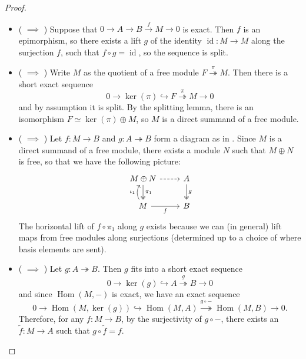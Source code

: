 \documentclass[11pt]{article}
\newcommand{\Hom}{\operatorname{Hom}}
\renewcommand{\ker}{\operatorname{ker}}
\theoremstyle{plain}
\theoremstyle{definition}
\begin{document}
\begin{proof}
\begin{itemize}
    \item ( \(\implies\) ) Suppose that \(0 \to A \to B \overset{f}{\to} M \to 0\) is exact. Then \(f\) is an epimorphism, so there exists a lift \(g\) of the identity \(\operatorname{id} : M \to M\) along the surjection \(f\), such that \(f \circ g = \operatorname{id}\), so the sequence is split.
    \item ( \(\implies\) ) Write \(M\) as the quotient of a free module \(F \overset{\pi}{\twoheadrightarrow} M\). Then there is a short exact sequence
      \[ 0 \to \ker(\pi) \hookrightarrow F \overset{\pi}{\twoheadrightarrow} M \to 0 \]
      and by assumption it is split. By the splitting lemma, there is an isomorphism \(F \simeq \ker(\pi) \oplus M\), so \(M\) is a direct summand of a free module.
    \item ( \(\implies\) ) Let \(f : M \to B\) and \(g : A \twoheadrightarrow B\) form a diagram as in . Since \(M\) is a direct summand of a free module, there exists a module \(N\) such that \(M \oplus N\) is free, so that we have the following picture:
      \[
        \begin{tikzcd}
         M \oplus N \arrow[two heads]{d}{\pi_1} \arrow[dashed]{r} & A \arrow[two heads]{d}{g} \\
         M \arrow[bend left]{u}{\iota_1} \arrow[swap]{r}{f} & B  
        \end{tikzcd}
      \]
      The horizontal lift of \(f \circ \pi_1\) along \(g\) exists because we can (in general) lift maps from free modules along surjections (determined up to a choice of where basis elements are sent).
    \item ( \(\implies\) ) Let \(g : A \twoheadrightarrow B\). Then \(g\) fits into a short exact sequence
      \[
        0 \to \ker(g) \hookrightarrow A \overset{g}{\twoheadrightarrow} B \to 0
      \]
      and since \(\Hom(M,-)\) is exact, we have an exact sequence
      \[
        0 \to \Hom(M,\ker(g)) \hookrightarrow \Hom(M, A) \overset{g \circ -}{\twoheadrightarrow} \Hom(M, B) \to 0.
      \]
      Therefore, for any \(f : M \to B\), by the surjectivity of \(g \circ -\), there exists an \(\widetilde{f} : M \to A\) such that \(g \circ \widetilde{f} = f\).
  \end{itemize}
\end{proof}
\end{document}
